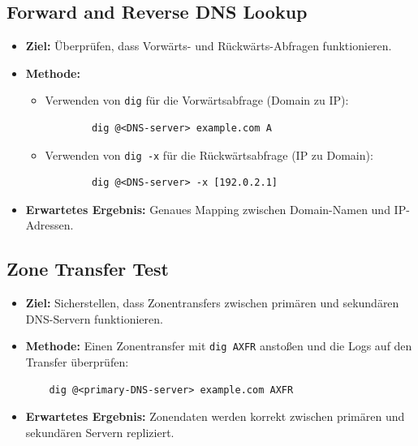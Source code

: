 \documentclass[a4paper,12pt]{article}
\begin{document}
\subsection*{Forward and Reverse DNS Lookup}
\begin{itemize}[leftmargin=1.5cm]
	\item \textbf{Ziel:} Überprüfen, dass Vorwärts- und Rückwärts-Abfragen funktionieren.
	\item \textbf{Methode:}
	      \begin{itemize}
		      \item Verwenden von \texttt{dig} für die Vorwärtsabfrage (Domain zu IP):
		            \begin{verbatim}
        dig @<DNS-server> example.com A
        \end{verbatim}
		      \item Verwenden von \texttt{dig -x} für die Rückwärtsabfrage (IP zu Domain):
		            \begin{verbatim}
        dig @<DNS-server> -x [192.0.2.1]
        \end{verbatim}
	      \end{itemize}
	\item \textbf{Erwartetes Ergebnis:} Genaues Mapping zwischen Domain-Namen und IP-Adressen.
\end{itemize}

\subsection*{Zone Transfer Test}
\begin{itemize}[leftmargin=1.5cm]
	\item \textbf{Ziel:} Sicherstellen, dass Zonentransfers zwischen primären und sekundären DNS-Servern funktionieren.
	\item \textbf{Methode:} Einen Zonentransfer mit \texttt{dig AXFR} anstoßen und die Logs auf den Transfer überprüfen:
	      \begin{verbatim}
    dig @<primary-DNS-server> example.com AXFR
    \end{verbatim}
	\item \textbf{Erwartetes Ergebnis:} Zonendaten werden korrekt zwischen primären und sekundären Servern repliziert.
\end{itemize}
\end{document}

